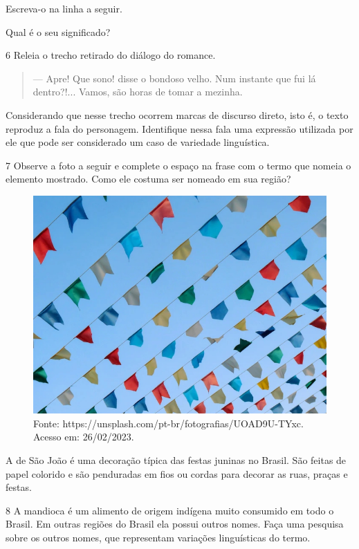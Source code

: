 \begin{escolha}
\item Escreva-o na linha a seguir.


\item Qual é o seu significado?

\end{escolha}

\num{6} Releia o trecho retirado do diálogo do romance.

\begin{quote}
--- Apre! Que sono! disse o bondoso velho. Num instante que fui lá
dentro?!... Vamos, são horas de tomar a mezinha.
\end{quote}

Considerando que nesse trecho ocorrem marcas de discurso direto, isto é,
o texto reproduz a fala do personagem. Identifique nessa fala uma
expressão utilizada por ele que pode ser considerado um caso de
variedade linguística.



\num{7} Observe a foto a seguir e complete o espaço na frase com o termo
que nomeia o elemento mostrado. Como ele costuma ser nomeado em sua
região?

\begin{figure}[htpb!]
\includegraphics[width=.5\textwidth]{./imgs/img19.jpg}
\caption{Fonte: https://unsplash.com/pt-br/fotografias/UOAD9U-TYxc. Acesso em: 26/02/2023.}
\end{figure}

A \preencher de São João é uma decoração típica das
festas juninas no Brasil. São feitas de papel colorido e são penduradas
em fios ou cordas para decorar as ruas, praças e festas.


\num{8} A mandioca é um alimento de origem indígena muito consumido em todo
o Brasil. Em outras regiões do Brasil ela possui outros nomes. Faça uma
pesquisa sobre os outros nomes, que representam variações linguísticas
do termo.


